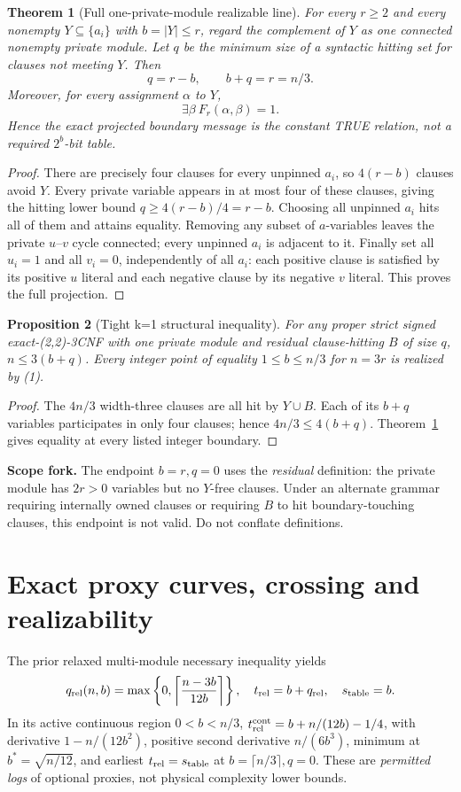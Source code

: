\documentclass[11pt]{article}
\newtheorem{theorem}{Theorem}
\newtheorem{proposition}[theorem]{Proposition}
\begin{document}
\begin{theorem}[Full one-private-module realizable line]\label{thm:line}
For every $r\ge2$ and every nonempty $Y\subseteq\{a_i\}$ with $b=|Y|\le r$, regard the complement of $Y$ as one connected nonempty private module. Let $q$ be the minimum size of a syntactic hitting set for clauses \emph{not meeting $Y$}. Then
\[
\boxed{q=r-b,\qquad b+q=r=n/3.}\tag{2}
\]
Moreover, for \emph{every} assignment $\alpha$ to $Y$,
\[
\boxed{\exists\beta\ F_r(\alpha,\beta)=1.}\tag{3}
\]
Hence the exact projected boundary message is the constant TRUE relation, not a required $2^b$-bit table.
\end{theorem}
\begin{proof}
There are precisely four clauses for every unpinned $a_i$, so $4(r-b)$ clauses avoid $Y$. Every private variable appears in at most four of these clauses, giving the hitting lower bound $q\ge 4(r-b)/4=r-b$. Choosing all unpinned $a_i$ hits all of them and attains equality. Removing any subset of $a$-variables leaves the private $u$--$v$ cycle connected; every unpinned $a_i$ is adjacent to it. Finally set all $u_i=1$ and all $v_i=0$, independently of all $a_i$: each positive clause is satisfied by its positive $u$ literal and each negative clause by its negative $v$ literal. This proves the full projection.
\end{proof}
\begin{proposition}[Tight k=1 structural inequality]
For any proper strict signed exact-(2,2)-3CNF with one private module and residual clause-hitting $B$ of size $q$, $n\le3(b+q)$. Every integer point of equality $1\le b\le n/3$ for $n=3r$ is realized by (1).
\end{proposition}
\begin{proof}
The $4n/3$ width-three clauses are all hit by $Y\cup B$. Each of its $b+q$ variables participates in only four clauses; hence $4n/3\le4(b+q)$. Theorem~\ref{thm:line} gives equality at every listed integer boundary.
\end{proof}
\noindent\textbf{Scope fork.} The endpoint $b=r,q=0$ uses the \emph{residual} definition: the private module has $2r>0$ variables but no $Y$-free clauses. Under an alternate grammar requiring internally owned clauses or requiring $B$ to hit boundary-touching clauses, this endpoint is not valid. Do not conflate definitions.

\section{Exact proxy curves, crossing and realizability}
The prior relaxed multi-module necessary inequality yields
\[
q_{\rm rel}(n,b)=\max\left\{0,\left\lceil\frac{n-3b}{12b}\right\rceil\right\},\quad
t_{\rm rel}=b+q_{\rm rel},\quad s_{\rm table}=b.
\]
In its active continuous region $0<b<n/3$, $t_{\rm rel}^{\rm cont}=b+n/(12b)-1/4$, with derivative $1-n/(12b^2)$, positive second derivative $n/(6b^3)$, minimum at $b^*=\sqrt{n/12}$, and earliest $t_{\rm rel}=s_{\rm table}$ at $b=\lceil n/3\rceil,q=0$. These are \emph{permitted logs} of optional proxies, not physical complexity lower bounds.
\end{document}
